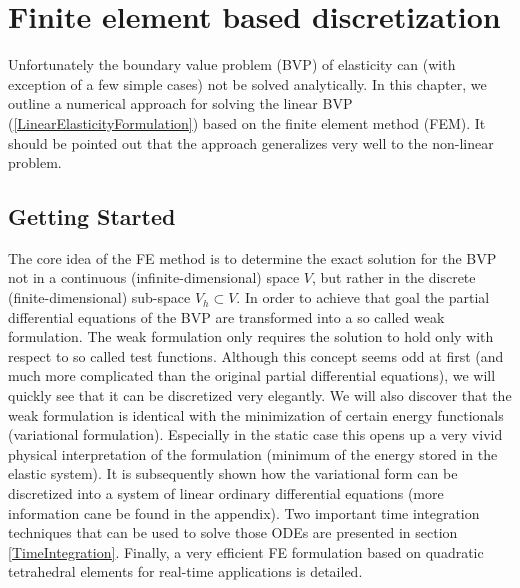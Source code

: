 

\chapter{Finite element based discretization}
\label{NumericalSolution}

Unfortunately the boundary value problem (BVP) of elasticity can (with exception of a few simple cases) not be solved analytically. In this chapter, we outline a numerical approach for solving the linear BVP (\ref{LinearElasticityFormulation}) based on the finite element method (FEM). It should be pointed out that the approach generalizes very well to the non-linear problem.

\section{Getting Started}

The core idea of the FE method is to determine the exact solution for the BVP not in a continuous (infinite-dimensional) space $V$, but rather in the discrete (finite-dimensional) sub-space $V_h \subset V$. In order to achieve that goal the partial differential equations of the BVP are transformed into a so called weak formulation. The weak formulation only requires the solution to hold only with respect to so called test functions. Although this concept seems odd at first (and much more complicated than the original partial differential equations), we will quickly see that it can be discretized very elegantly. We will also discover that the weak formulation is identical with the minimization of certain energy functionals (variational formulation). Especially in the static case this opens up a very vivid physical interpretation of the formulation (minimum of the energy stored in the elastic system). It is subsequently shown how the variational form can be discretized into a system of linear ordinary differential equations (more information cane be found in the appendix). Two important time integration techniques that can be used to solve those ODEs are presented in section \ref{TimeIntegration}. Finally, a very efficient FE formulation based on quadratic tetrahedral elements for real-time applications is detailed.

